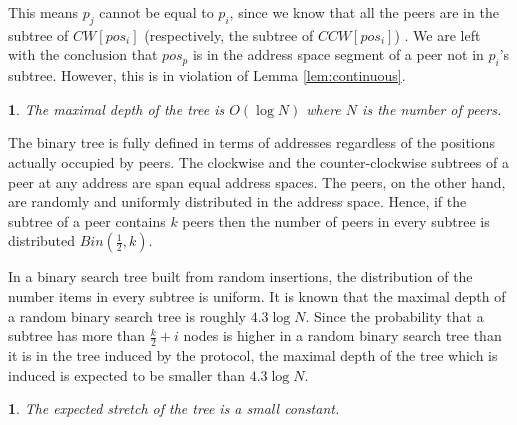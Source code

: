 \documentclass[12pt,english,journal]{elsarticle}
\makeatletter
\numberwithin{equation}{section}
\numberwithin{figure}{section}
\theoremstyle{plain}
\theoremstyle{plain}
\newtheorem{lem}[thm]{\protect\lemmaname}
\newenvironment{proof}[1][\protect\proofname]{\par
\normalfont\topsep6\p@\@plus6\p@\relax
\trivlist
\itemindent\parindent
\item[\hskip\labelsep
\scshape
#1]\ignorespaces
}{\endtrivlist\@endpefalse
}
\providecommand{\proofname}{Proof}
\providecommand{\lemmaname}{Lemma}
\makeatother
\begin{document}
This means $p_{j}$ cannot be equal to $p_{i}$, since we know that
all the peers are in the subtree of $CW\left[pos_{i}\right]$ (respectively,
the subtree of $CCW\left[pos_{i}\right]$) . We are left with the
conclusion that $pos_{p}$ is in the address space segment of a peer
not in $p_{i}$'s subtree. However, this is in violation of Lemma
\ref{lem:continuous}.
\begin{lem}
The maximal depth of the tree is $O\left(\log N\right)$ where $N$
is the number of peers.\end{lem}
\begin{proof}
The binary tree is fully defined in terms of addresses regardless
of the positions actually occupied by peers. The clockwise and the
counter-clockwise subtrees of a peer at any address are span equal
address spaces. The peers, on the other hand, are randomly and uniformly
distributed in the address space. Hence, if the subtree of a peer
contains $k$ peers then the number of peers in every subtree is distributed
$Bin\left(\frac{1}{2},k\right)$. 

In a binary search tree built from random insertions, the distribution
of the number items in every subtree is uniform. It is known that
the maximal depth of a random binary search tree is roughly $4.3\log N$.
Since the probability that a subtree has more than $\frac{k}{2}+i$
nodes is higher in a random binary search tree than it is in the tree
induced by the protocol, the maximal depth of the tree which is induced
is expected to be smaller than $4.3\log N$.\end{proof}
\begin{lem}
The expected stretch of the tree is a small constant.\end{lem}
\end{document}
